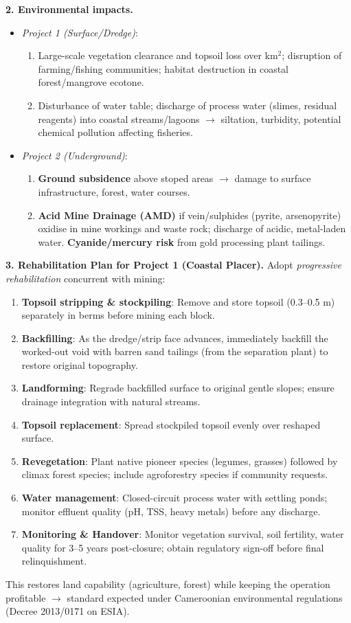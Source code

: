 \documentclass[11pt]{article}
\begin{document}
\begin{exoresolu}
\textbf{2. Environmental impacts.}
\begin{itemize}
\item \emph{Project 1 (Surface/Dredge)}:
\begin{enumerate}
\item Large-scale vegetation clearance and topsoil loss over km$^2$; disruption of farming/fishing communities; habitat destruction in coastal forest/mangrove ecotone.
\item Disturbance of water table; discharge of process water (slimes, residual reagents) into coastal streams/lagoons $\rightarrow$ siltation, turbidity, potential chemical pollution affecting fisheries.
\end{enumerate}
\item \emph{Project 2 (Underground)}:
\begin{enumerate}
\item \textbf{Ground subsidence} above stoped areas $\rightarrow$ damage to surface infrastructure, forest, water courses.
\item \textbf{Acid Mine Drainage (AMD)} if vein/sulphides (pyrite, arsenopyrite) oxidise in mine workings and waste rock; discharge of acidic, metal-laden water. \textbf{Cyanide/mercury risk} from gold processing plant tailings.
\end{enumerate}
\end{itemize}

\textbf{3. Rehabilitation Plan for Project 1 (Coastal Placer).}
Adopt \emph{progressive rehabilitation} concurrent with mining:
\begin{enumerate}
\item \textbf{Topsoil stripping \& stockpiling}: Remove and store topsoil (0.3--0.5 m) separately in berms before mining each block.
\item \textbf{Backfilling}: As the dredge/strip face advances, immediately backfill the worked-out void with barren sand tailings (from the separation plant) to restore original topography.
\item \textbf{Landforming}: Regrade backfilled surface to original gentle slopes; ensure drainage integration with natural streams.
\item \textbf{Topsoil replacement}: Spread stockpiled topsoil evenly over reshaped surface.
\item \textbf{Revegetation}: Plant native pioneer species (legumes, grasses) followed by climax forest species; include agroforestry species if community requests.
\item \textbf{Water management}: Closed-circuit process water with settling ponds; monitor effluent quality (pH, TSS, heavy metals) before any discharge.
\item \textbf{Monitoring \& Handover}: Monitor vegetation survival, soil fertility, water quality for 3--5 years post-closure; obtain regulatory sign-off before final relinquishment.
\end{enumerate}
This restores land capability (agriculture, forest) while keeping the operation profitable $\rightarrow$ standard expected under Cameroonian environmental regulations (Decree 2013/0171 on ESIA).
\end{exoresolu}
\end{document}

